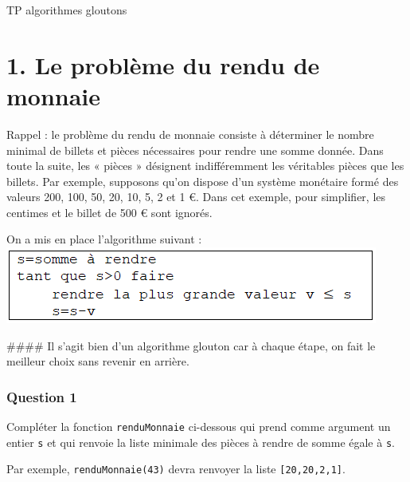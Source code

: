 \documentclass[
  paper=a4,
  ,captions=tableheading
]{scrartcl}
\author{}
\date{}
\title{}
\author{}
\date{}
\begin{document}




TP algorithmes gloutons

\hypertarget{1-le-probluxe8me-du-rendu-de-monnaie}{%
\section{1. Le problème du rendu de
monnaie}\label{1-le-probluxe8me-du-rendu-de-monnaie}}

Rappel : le problème du rendu de monnaie consiste à déterminer le nombre
minimal de billets et pièces nécessaires pour rendre une somme donnée.
Dans toute la suite, les « pièces » désignent indifféremment les
véritables pièces que les billets. Par exemple, supposons qu'on dispose
d'un système monétaire formé des valeurs 200, 100, 50, 20, 10, 5, 2 et 1
€. Dans cet exemple, pour simplifier, les centimes et le billet de 500 €
sont ignorés.

On a mis en place l'algorithme suivant :\\
\includegraphics{images/1-image.png}

\#\#\#\# Il s'agit bien d'un algorithme glouton car à chaque étape, on
fait le meilleur choix sans revenir en arrière.

\hypertarget{question-1}{%
\subsubsection{Question 1}\label{question-1}}

Compléter la fonction \texttt{renduMonnaie} ci-dessous qui prend comme
argument un entier \texttt{s} et qui renvoie la liste minimale des
pièces à rendre de somme égale à \texttt{s}.

Par exemple, \texttt{renduMonnaie(43)} devra renvoyer la liste
\texttt{{[}20,20,2,1{]}}.
\end{document}
